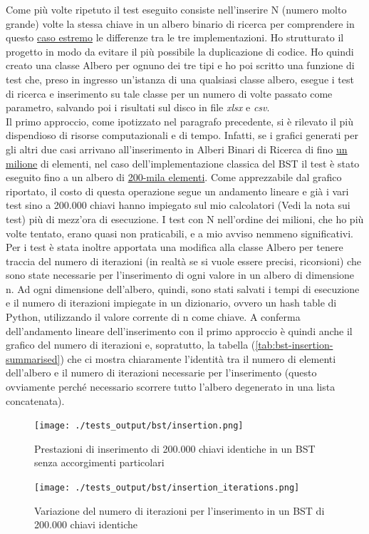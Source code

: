 \documentclass{article}
\begin{document}
Come più volte ripetuto il test eseguito consiste nell'inserire N (numero molto grande) volte la stessa chiave in un albero binario di ricerca per comprendere in questo \underline{caso estremo} le differenze tra le tre implementazioni.
Ho strutturato il progetto in modo da evitare il più possibile la duplicazione di codice. Ho quindi creato una classe Albero per ognuno dei tre tipi e ho poi scritto una funzione di test che, preso in ingresso un'istanza di una qualsiasi classe albero, esegue i test di ricerca e inserimento su tale classe per un numero di volte passato come parametro, salvando poi i risultati sul disco in file \textit{xlsx} e \textit{csv}.\\
Il primo approccio, come ipotizzato nel paragrafo precedente, si è rilevato il più dispendioso di risorse computazionali e di tempo. Infatti, se i grafici generati per gli altri due casi arrivano all'inserimento in Alberi Binari di Ricerca di fino \underline{un milione} di elementi, nel caso dell'implementazione classica del BST il test è stato eseguito fino a un albero di \underline{200-mila elementi}. Come apprezzabile dal grafico riportato, il costo di questa operazione segue un andamento lineare e già i vari test sino a 200.000 chiavi hanno impiegato sul mio calcolatori (Vedi la nota sui test) più di mezz'ora di esecuzione. I test con N nell'ordine dei milioni, che ho più volte tentato, erano quasi non praticabili, e a mio avviso nemmeno significativi. Per i test è stata inoltre apportata una modifica alla classe Albero per tenere traccia del numero di iterazioni (in realtà se si vuole essere precisi, ricorsioni) che sono state necessarie per l'inserimento di ogni valore in un albero di dimensione n. Ad ogni dimensione dell'albero, quindi, sono stati salvati i tempi di esecuzione e il numero di iterazioni impiegate in un dizionario, ovvero un hash table di Python, utilizzando il valore corrente di n come chiave.
A conferma dell'andamento lineare dell'inserimento con il primo approccio è quindi anche il grafico del numero di iterazioni e, sopratutto, la tabella (\ref{tab:bst-insertion-summarised}) che ci mostra chiaramente l'identità tra il numero di elementi dell'albero e il numero di iterazioni necessarie per l'inserimento (questo ovviamente perché necessario scorrere tutto l'albero degenerato in una lista concatenata).


\begin{figure}[htbp]
 \begin{minipage}{0.5\textwidth}
    \centering
    \texttt{[image: ./tests\_output/bst/insertion.png]}
    \caption{Prestazioni di inserimento di 200.000 chiavi identiche in un BST senza accorgimenti particolari}
    \label{fig:bst-normal-insetion}
  \end{minipage}
    \hspace{0.05\textwidth}
  \begin{minipage}{0.5\textwidth}
    \centering
    \texttt{[image: ./tests\_output/bst/insertion\_iterations.png]}
    \caption{Variazione del numero di iterazioni per l'inserimento in un BST di 200.000 chiavi identiche}
    \label{fig:bst-normal-insetion-iterations}
  \end{minipage}%
\end{figure}
\end{document}

